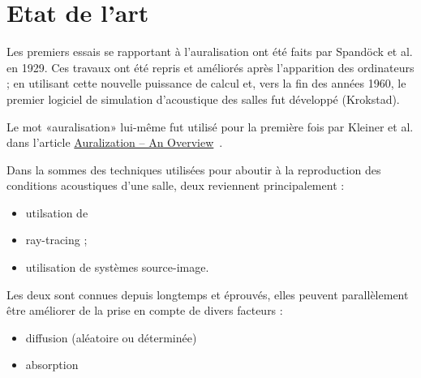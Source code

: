 \section{Etat de l'art}

Les premiers essais se rapportant à l'auralisation ont été faits par Spandöck et al. en 1929.
Ces travaux ont été repris et améliorés après l'apparition des ordinateurs ; en utilisant cette nouvelle puissance de
calcul et, vers la fin des années 1960, le premier logiciel de simulation d'acoustique des salles fut développé
(Krokstad).

Le mot «auralisation» lui-même fut utilisé pour la première fois par Kleiner et al. dans l'article
\underline{Auralization -- An Overview}~\cite{kleiner1993}.

Dans la sommes des techniques utilisées pour aboutir à la reproduction des conditions acoustiques d'une salle, deux
reviennent principalement :

\begin{itemize}
    \item utilsation de \item{ray-tracing} ;
    \item utilisation de systèmes source-image.
\end{itemize}

Les deux sont connues depuis longtemps et éprouvés, elles peuvent parallèlement être améliorer de la prise en compte de
divers facteurs :

\begin{itemize}
    \item diffusion (aléatoire ou déterminée)
    \item absorption
\end{itemize}

